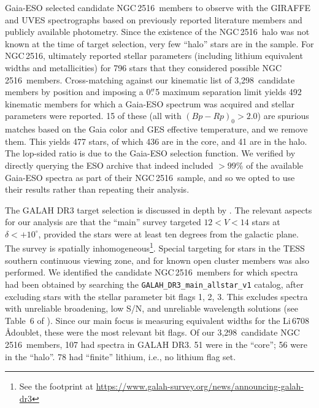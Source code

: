\documentclass[12pt,twocolumn,tighten]{aastex63}
\newcommand{\cn}{NGC\,2516} %
\newcommand{\nkinematic}{3{,}298\ } %
\begin{document}
Gaia-ESO selected candidate \cn\ members to observe with the GIRAFFE
and UVES spectrographs based on previously reported literature members
and publicly available photometry.  Since the existence of the \cn\
halo was not known at the time of target selection, very few ``halo''
stars are in the sample.  For \cn, \citet{randich_gaiaeso_2018}
ultimately reported stellar parameters (including lithium equivalent
widths and metallicities) for 796 stars that they considered possible
\cn\ members.  Cross-matching against our kinematic list of
\nkinematic candidate members by position and imposing a 0$\mbox{$.\!\!^{\prime\prime}$}$5
maximum separation limit yields 492 kinematic members for which a
Gaia-ESO spectrum was acquired and stellar parameters were reported.
15 of these (all with $(Bp-Rp)_0 > 2.0$) are spurious matches based on
the Gaia color and GES effective temperature, and we remove them.
This yields 477 stars, of which 436 are in the core, and 41 are in the
halo.  The lop-sided ratio is due to the Gaia-ESO selection function.
We verified by directly querying the ESO archive that
\citet{randich_gaiaeso_2018} indeed included $>99\%$ of the available
Gaia-ESO spectra as part of their \cn\ sample, and so we opted to use
their results rather than repeating their analysis.

The GALAH DR3 target selection is discussed in depth by
\citet{buder_galah_2020}.  The relevant aspects for our analysis
are that the ``main'' survey targeted $12<V<14$ stars at
$\delta<+10^\circ$, provided the stars were at least ten degrees from
the galactic plane.  The survey is spatially
inhomogeneous\footnote{See the footprint at
\url{https://www.galah-survey.org/news/announcing-galah-dr3}}. Special
targeting for stars in the TESS southern continuous viewing zone, and
for known open cluster members was also performed.  We identified the
candidate \cn\ members for which spectra had been obtained by
searching the \texttt{GALAH\_DR3\_main\_allstar\_v1} catalog, after
excluding stars with the stellar parameter bit flags 1, 2, 3.  This
excludes spectra with unreliable broadening, low S/N, and unreliable
wavelength solutions (see Table~6 of \citealt{buder_galah_2020}).
Since our main focus is measuring equivalent widths for the
Li\,6708\,\AA doublet, these were the most relevant bit flags.  Of our
\nkinematic candidate \cn\ members, 107 had spectra in GALAH DR3.  51
were in the ``core''; 56 were in the ``halo''.  78 had ``finite''
lithium, i.e., no lithium flag set.
\end{document}
